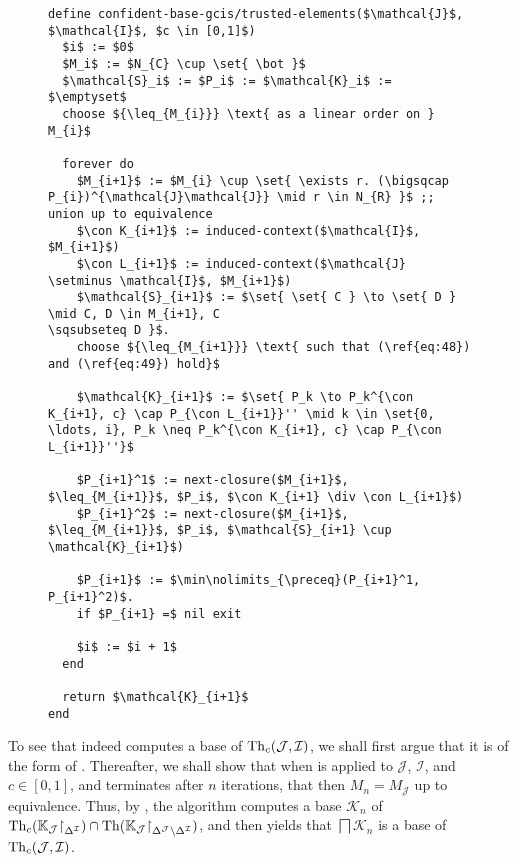 
\begin{figure}[tp]
  \begin{Algorithm}
    \hspace*{0cm}
    \label{alg:confident-base-gcis/trusted-objects}
    \begin{lstlisting}
define confident-base-gcis/trusted-elements($\mathcal{J}$, $\mathcal{I}$, $c \in [0,1]$)
  $i$ := $0$
  $M_i$ := $N_{C} \cup \set{ \bot }$
  $\mathcal{S}_i$ := $P_i$ := $\mathcal{K}_i$ := $\emptyset$
  choose ${\leq_{M_{i}}} \text{ as a linear order on } M_{i}$
  
  forever do
    $M_{i+1}$ := $M_{i} \cup \set{ \exists r. (\bigsqcap P_{i})^{\mathcal{J}\mathcal{J}} \mid r \in N_{R} }$ ;; union up to equivalence
    $\con K_{i+1}$ := induced-context($\mathcal{I}$, $M_{i+1}$)
    $\con L_{i+1}$ := induced-context($\mathcal{J} \setminus \mathcal{I}$, $M_{i+1}$)
    $\mathcal{S}_{i+1}$ := $\set{ \set{ C } \to \set{ D } \mid C, D \in M_{i+1}, C
\sqsubseteq D }$.
    choose ${\leq_{M_{i+1}}} \text{ such that (\ref{eq:48}) and (\ref{eq:49}) hold}$

    $\mathcal{K}_{i+1}$ := $\set{ P_k \to P_k^{\con K_{i+1}, c} \cap P_{\con L_{i+1}}'' \mid k \in \set{0, \ldots, i}, P_k \neq P_k^{\con K_{i+1}, c} \cap P_{\con L_{i+1}}''}$

    $P_{i+1}^1$ := next-closure($M_{i+1}$, $\leq_{M_{i+1}}$, $P_i$, $\con K_{i+1} \div \con L_{i+1}$)
    $P_{i+1}^2$ := next-closure($M_{i+1}$, $\leq_{M_{i+1}}$, $P_i$, $\mathcal{S}_{i+1} \cup \mathcal{K}_{i+1}$)

    $P_{i+1}$ := $\min\nolimits_{\preceq}(P_{i+1}^1, P_{i+1}^2)$.
    if $P_{i+1} =$ nil exit

    $i$ := $i + 1$
  end

  return $\mathcal{K}_{i+1}$  
end
    \end{lstlisting}
  \end{Algorithm}
\end{figure}

To see that  indeed computes a base of
$\operatorname{Th}_{c}(\mathcal{J}, \mathcal{I})$, we shall first argue that it is of the form of
.  Thereafter, we shall show
that when  is applied to $\mathcal{J}$,
$\mathcal{I}$, and $c \in [0,1]$, and terminates after $n$ iterations, that then $M_{n} =
M_{\mathcal{J}}$ up to equivalence.  Thus, by
, the
algorithm computes a base $\mathcal{K}_{n}$ of $\operatorname{Th}_{c}({\mathbb{K}}_{\mathcal{J}}
\mathord{\upharpoonright}_{\Delta^{\mathcal{I}}}) \cap \operatorname{Th}({\mathbb{K}}_{\mathcal{J}}
\mathord{\upharpoonright}_{\Delta^{\mathcal{J}} \setminus \Delta^{\mathcal{I}}})$, and then
 yields that
$\bigsqcap \mathcal{K}_{n}$ is a base of $\operatorname{Th}_{c}(\mathcal{J}, \mathcal{I})$.


